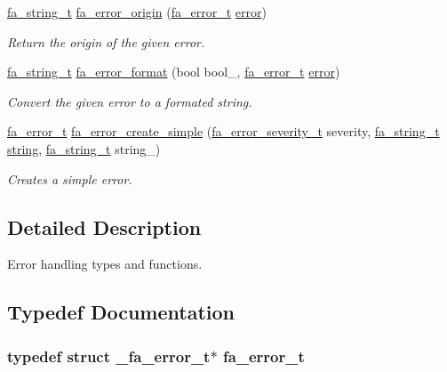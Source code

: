 \begin{DoxyCompactItemize}
\hyperlink{group___fa_string_gacada63033b77bc6c39fa632ae199349b}{fa\-\_\-string\-\_\-t} \hyperlink{group___fa_error_ga1bb041273b8f969a8c2d7bd292141110}{fa\-\_\-error\-\_\-origin} (\hyperlink{group___fa_error_ga4a4feb4d3686657ac8dbd2be421cbb15}{fa\-\_\-error\-\_\-t} \hyperlink{group___fa_error_gga5cf5c13f1e12ae6b125c0265f59f4d82ad606e435413ea0944dd00d49e901e4ed}{error})
\begin{DoxyCompactList}\small\item\em Return the origin of the given error. \end{DoxyCompactList}\item 
\hyperlink{group___fa_string_gacada63033b77bc6c39fa632ae199349b}{fa\-\_\-string\-\_\-t} \hyperlink{group___fa_error_ga0ecd2e70e166904907ed98f102d1d59a}{fa\-\_\-error\-\_\-format} (bool bool\-\_\-, \hyperlink{group___fa_error_ga4a4feb4d3686657ac8dbd2be421cbb15}{fa\-\_\-error\-\_\-t} \hyperlink{group___fa_error_gga5cf5c13f1e12ae6b125c0265f59f4d82ad606e435413ea0944dd00d49e901e4ed}{error})
\begin{DoxyCompactList}\small\item\em Convert the given error to a formated string. \end{DoxyCompactList}\item 
\hyperlink{group___fa_error_ga4a4feb4d3686657ac8dbd2be421cbb15}{fa\-\_\-error\-\_\-t} \hyperlink{group___fa_error_gadd811b06a5cd740039902f77efd4e661}{fa\-\_\-error\-\_\-create\-\_\-simple} (\hyperlink{group___fa_error_ga5cf5c13f1e12ae6b125c0265f59f4d82}{fa\-\_\-error\-\_\-severity\-\_\-t} severity, \hyperlink{group___fa_string_gacada63033b77bc6c39fa632ae199349b}{fa\-\_\-string\-\_\-t} \hyperlink{util_8h_a41106000aac73b61e4fc2ef9dd39a603}{string}, \hyperlink{group___fa_string_gacada63033b77bc6c39fa632ae199349b}{fa\-\_\-string\-\_\-t} string\-\_\-)
\begin{DoxyCompactList}\small\item\em Creates a simple error. \end{DoxyCompactList}\end{DoxyCompactItemize}


\subsection{Detailed Description}
Error handling types and functions. 

\subsection{Typedef Documentation}
\hypertarget{group___fa_error_ga4a4feb4d3686657ac8dbd2be421cbb15}{
\subsubsection[{fa\-\_\-error\-\_\-t}]{\setlength{\rightskip}{0pt plus 5cm}typedef struct \-\_\-fa\-\_\-error\-\_\-t$\ast$ {\bf fa\-\_\-error\-\_\-t}}}\label{group___fa_error_ga4a4feb4d3686657ac8dbd2be421cbb15}


